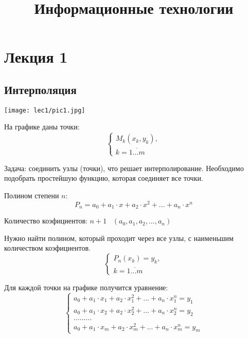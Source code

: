 \documentclass[12pt]{article}
\title{Информационные технологии}
\begin{document}
\maketitle
\newpage

\section{Лекция 1}

\subsection{Интерполяция}
\begin{center}
	\texttt{[image: lec1/pic1.jpg]}
\end{center}

На графике даны точки:
\begin{equation*}
	\begin{cases}
		M_k (x_k, y_k), \\
		k = \overline{1 \ldots m}
	\end{cases}
\end{equation*}

Задача: соединить узлы (точки), что решает интерполирование.
Необходимо подобрать простейшую функцию, которая соединяет все точки.

Полином степени \( n \):
\[  P_n = a_0 + a_1 \cdot x + a_2 \cdot x^2 + ... + a_n \cdot x^n \]

Количество коэфициентов:
\( n + 1 \hspace{10pt} (a_0, a_1, a_2, \ldots , a_n) \)

Нужно найти полином, который проходит через все узлы, с наименьшим количеством
коэфициентов.
\begin{equation*}
	\begin{cases}
		P_n(x_k) = y_k, \\
		k= \overline{1 \ldots m}
	\end{cases}
\end{equation*}

Для каждой точки на графике получится уравнение:
\begin{equation*}
	\begin{cases}
		a_0 + a_1 \cdot x_1 + a_2 \cdot x_1^2 + ... + a_n \cdot x_1^n = y_1 \\
		a_0 + a_1 \cdot x_2 + a_2 \cdot x_2^2 + ... + a_n \cdot x_2^n = y_2 \\
		\ldots \ldots \ldots                                                \\
		a_0 + a_1 \cdot x_m + a_2 \cdot x_m^2 + ... + a_n \cdot x_m^n = y_m
	\end{cases}
\end{equation*}
\end{document}
